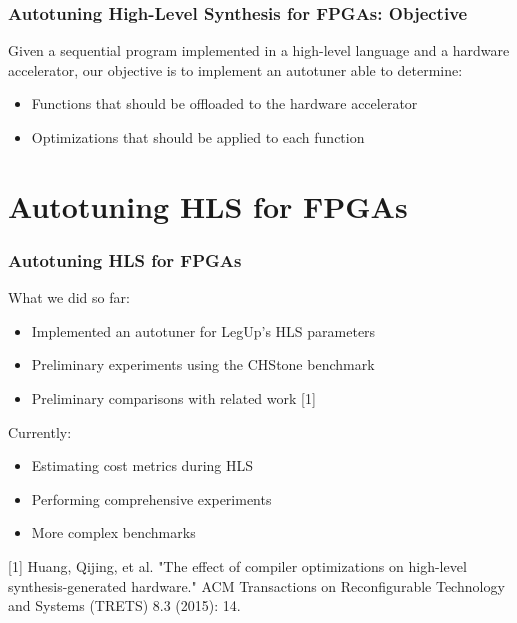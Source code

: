 \documentclass[10pt, compress, aspectratio=169]{beamer}
\begin{document}
\begin{frame}
    \frametitle{Autotuning High-Level Synthesis for FPGAs: Objective}
    Given a \alert{sequential program} implemented in a \alert{high-level
    language} and a \alert{hardware accelerator}, our objective is to implement
    an \alert{autotuner} able to determine:

    \begin{itemize}
        \item \alert{Functions that should be offloaded} to the hardware accelerator
        \item \alert{Optimizations} that should be applied to each function
    \end{itemize}
\end{frame}



\section{Autotuning HLS for FPGAs}

\begin{frame}
    \frametitle{Autotuning HLS for FPGAs}
    \vfill
    What we did so far:

    \begin{itemize}
        \item Implemented an \alert{autotuner} for LegUp's \alert{HLS parameters}
        \item Preliminary \alert{experiments} using the CHStone \alert{benchmark}
        \item Preliminary \alert{comparisons} with related work [1]
    \end{itemize}

    Currently:
    \begin{itemize}
        \item \alert{Estimating cost metrics} during HLS
        \item Performing comprehensive experiments
        \item More \alert{complex benchmarks}
    \end{itemize}

    \begin{center}
        \tiny{[1] Huang, Qijing, et al. "The effect of compiler optimizations
        on high-level synthesis-generated hardware." ACM Transactions on
        Reconfigurable Technology and Systems (TRETS) 8.3 (2015): 14.}
    \end{center}
\end{frame}
\end{document}

